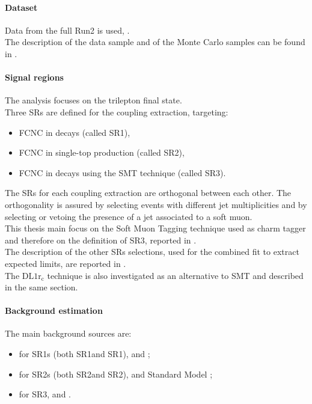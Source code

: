\paragraph{Dataset}
Data from the full Run2 is used, \lumi. \\
The description of the data sample and of the Monte Carlo samples can
be found in .

\paragraph{Signal regions}
The analysis focuses on the trilepton final state. \\
Three SRs are defined for the \tZc coupling extraction, targeting:
\begin{itemize}
	\item FCNC \tZc in \ttbar decays (called SR1\tZc), 
	\item FCNC \tZc in single-top production (called SR2\tZc), 
	\item FCNC \tZc in \ttbar decays using the SMT technique (called SR3\tZc). 
\end{itemize}
The SRs for each coupling extraction are orthogonal between each other. 
The orthogonality is assured by selecting events with different jet multiplicities 
and by selecting or vetoing the presence of a jet associated to a soft muon.\\
This thesis main focus on the Soft Muon Tagging technique used as charm tagger and therefore on the definition of SR3, reported in .\\
The description of the other SRs selections, used for the combined fit to extract expected limits, are reported in .\\
The $\mathrm{DL1r_{c}}$ technique is also investigated as an alternative to SMT and described in the same section.

\paragraph{Background estimation}
The main background sources are:
\begin{itemize}
	\item for SR1s (both SR1\tZu and SR1\tZc), \ttZ and \VVHF;
	\item for SR2s (both SR2\tZu and SR2\tZc), \VVHF and Standard Model \tZq ;
	\item for SR3, \ttZ and \VVHF.
\end{itemize}

